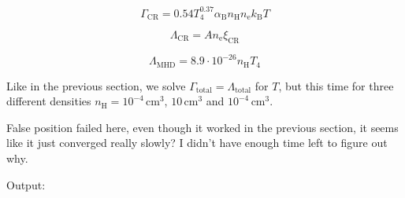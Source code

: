 \begin{equation}\label{eqn:heating}
\Gamma_\mathrm{CR} = 0.54 T_4^{0.37} \alpha_\mathrm{B} n_\mathrm{H} n_\mathrm{e} k_\mathrm{B} T
\end{equation}

\begin{equation}\label{eqn:cooling}
\Lambda_\mathrm{CR} = A n_\mathrm{e} \xi_\mathrm{CR}
\end{equation}

\begin{equation}\label{eqn:cooling}
\Lambda_\mathrm{MHD} = 8.9\cdot10^{-26} n_\mathrm{H} T_4
\end{equation}

Like in the previous section, we solve $\Gamma_\mathrm{total} = \Lambda_\mathrm{total}$ for $T$, but this time for three different densities $n_\mathrm{H}=10^{-4}\,\mathrm{cm^3}$, $10\,\mathrm{cm^3}$ and $10^{-4}\,\mathrm{cm^3}$.

False position failed here, even though it worked in the previous section, it seems like it just converged really slowly? I didn't have enough time left to figure out why.



Output:


